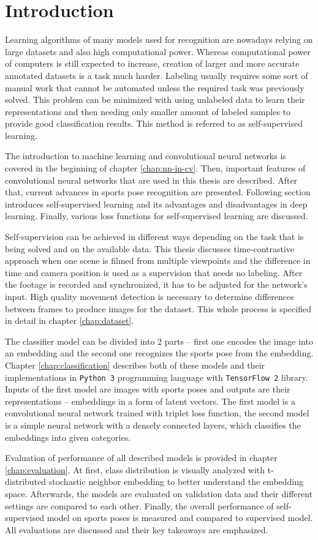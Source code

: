 \chapter{\label{chap:intro}Introduction}

Learning algorithms of many models used for recognition are nowadays relying on large datasets and also high computational power. Whereas computational power of computers is still expected to increase, creation of larger and more accurate annotated datasets is a task much harder. Labeling usually requires some sort of manual work that cannot be automated unless the required task was previously solved. This problem can be minimized with using unlabeled data to learn their representations and then needing only smaller amount of labeled samples to provide good classification results. This method is referred to as self-supervised learning.

The introduction to machine learning and convolutional neural networks is covered in the beginning of chapter \ref{chap:nn-in-cv}. Then, important features of convolutional neural networks that are used in this thesis are described. After that, current advances in sports pose recognition are presented. Following section introduces self-supervised learning and its advantages and disadvantages in deep learning. Finally, various loss functions for self-supervised learning are discussed.

Self-supervision can be achieved in different ways depending on the task that is being solved and on the available data. This thesis discusses time-contrastive approach when one scene is filmed from multiple viewpoints and the difference in time and camera position is used as a supervision that needs no labeling. After the footage is recorded and synchronized, it has to be adjusted for the network's input. High quality movement detection is necessary to determine differences between frames to produce images for the dataset. This whole process is specified in detail in chapter \ref{chap:dataset}.

The classifier model can be divided into 2 parts -- first one encodes the image into an embedding and the second one recognizes the sports pose from the embedding. Chapter \ref{chap:classification} describes both of these models and their implementations in \texttt{Python 3} programming language with \texttt{TensorFlow 2} library. Inputs of the first model are images with sports poses and outputs are their representations -- embeddings in a form of latent vectors. The first model is a convolutional neural network trained with triplet loss function, the second model is a simple neural network with a densely connected layers, which classifies the embeddings into given categories.

Evaluation of performance of all described models is provided in chapter \ref{chap:evaluation}. At first, class distribution is visually analyzed with t-distributed stochastic neighbor embedding to better understand the embedding space. Afterwards, the models are evaluated on validation data and their different settings are compared to each other. Finally, the overall performance of self-supervised model on sports poses is measured and compared to supervised model. All evaluations are discussed and their key takeaways are emphasized.
